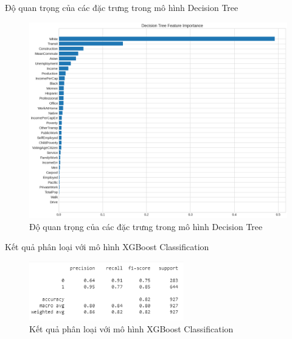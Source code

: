 \documentclass[10pt]{beamer}
\theoremstyle{remark}
\theoremstyle{definition}
\begin{document}
\begin{frame}{Độ quan trọng của các đặc trưng trong mô hình Decision Tree}
	\begin{figure}[h!]
        \centering
        \includegraphics[height=0.7\textheight]{figures/Decision_Tree_Feature_Importance.png}
        \caption{Độ quan trọng của các đặc trưng trong mô hình Decision Tree}
    \end{figure}
\end{frame}

\begin{frame}{Kết quả phân loại với mô hình XGBoost Classification}
	\begin{figure}[h!]
        \centering
        \includegraphics[width=0.6\textwidth]{figures/XGBoost_Classifier_Report.png}
        \caption{Kết quả phân loại với mô hình XGBoost Classification}
    \end{figure}
\end{frame}
\end{document}
